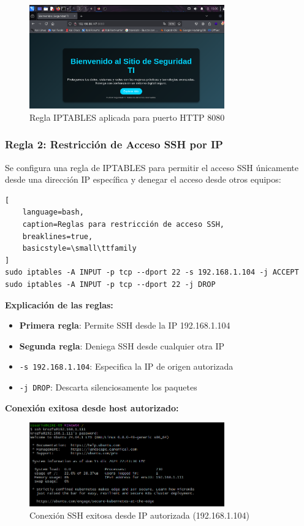 \documentclass[12pt,a4paper]{article}
\begin{document}
\begin{figure}[H]
  \centering
  \includegraphics[width=0.75\textwidth]{./assets/img8.png}
  \caption{Regla IPTABLES aplicada para puerto HTTP 8080}
  \label{fig:http-rule}
\end{figure}

\subsubsection{Regla 2: Restricción de Acceso SSH por IP}

Se configura una regla de IPTABLES para permitir el acceso SSH únicamente desde
una dirección IP específica y denegar el acceso desde otros equipos:

\begin{lstlisting}[
    language=bash, 
    caption=Reglas para restricción de acceso SSH,
    breaklines=true,
    basicstyle=\small\ttfamily
]
sudo iptables -A INPUT -p tcp --dport 22 -s 192.168.1.104 -j ACCEPT
sudo iptables -A INPUT -p tcp --dport 22 -j DROP
\end{lstlisting}

\textbf{Explicación de las reglas:}
\begin{itemize}
  \item \textbf{Primera regla}: Permite SSH desde la IP 192.168.1.104
  \item \textbf{Segunda regla}: Deniega SSH desde cualquier otra IP
  \item \texttt{-s 192.168.1.104}: Especifica la IP de origen autorizada
  \item \texttt{-j DROP}: Descarta silenciosamente los paquetes
\end{itemize}

\textbf{Conexión exitosa desde host autorizado:}

\begin{figure}[H]
  \centering
  \includegraphics[width=0.75\textwidth]{./assets/img9.png}
  \caption{Conexión SSH exitosa desde IP autorizada (192.168.1.104)}
  \label{fig:ssh-success}
\end{figure}
\end{document}
